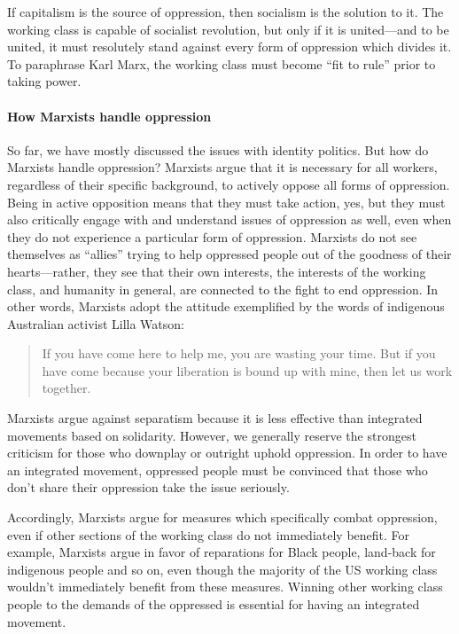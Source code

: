 If capitalism is the source of oppression, then socialism is the solution to it. The working class is capable of socialist revolution, but only if it is united---and to be united, it must resolutely stand against every form of oppression which divides it. To paraphrase Karl Marx, the working class must become ``fit to rule'' prior to taking power.

\paragraph{How Marxists handle oppression}

So far, we have mostly discussed the issues with identity politics. But how do Marxists handle oppression? Marxists argue that it is necessary for all workers, regardless of their specific background, to actively oppose all forms of oppression. Being in active opposition means that they must take action, yes, but they must also critically engage with and understand issues of oppression as well, even when they do not experience a particular form of oppression. Marxists do not see themselves as ``allies'' trying to help oppressed people out of the goodness of their hearts---rather, they see that their own interests, the interests of the working class, and humanity in general, are connected to the fight to end oppression. In other words, Marxists adopt the attitude exemplified by the words of indigenous Australian activist Lilla Watson:

\blockquote{If you have come here to help me, you are wasting your time. But if you have come because your liberation is bound up with mine, then let us work together.}

Marxists argue against separatism because it is less effective than integrated movements based on solidarity. However, we generally reserve the strongest criticism for those who downplay or outright uphold oppression. In order to have an integrated movement, oppressed people must be convinced that those who don't share their oppression take the issue seriously.

Accordingly, Marxists argue for measures which specifically combat oppression, even if other sections of the working class do not immediately benefit. For example, Marxists argue in favor of reparations for Black people, land-back for indigenous people and so on, even though the majority of the US working class wouldn't immediately benefit from these measures. Winning other working class people to the demands of the oppressed is essential for having an integrated movement.

